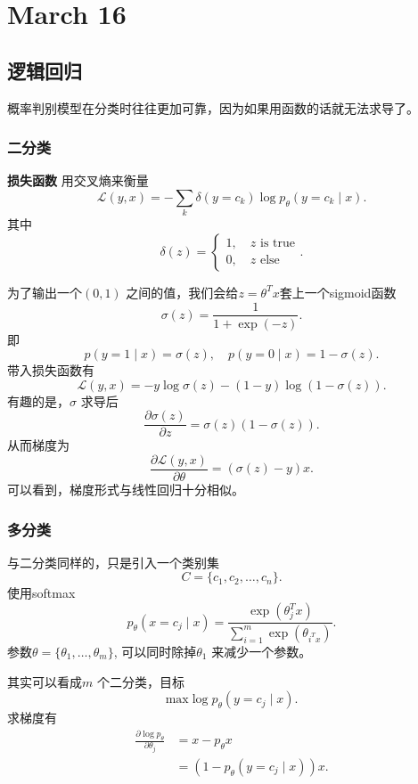 
\chapter{March 16}
\section{逻辑回归} 
概率判别模型在分类时往往更加可靠，因为如果用函数的话就无法求导了。
\subsection{二分类}
\noindent \textbf{损失函数}
用交叉熵来衡量
\[
		\mathcal{L}\left( y,x \right)  = -\sum_{k} \delta\left( y=c_{k} \right) \log p_{\theta}\left( y=c_k \mid x \right) 
.\] 
其中
\[
		\delta\left( z \right)  = \begin{cases}
				1, \quad z \text{ is true} \\
				0, \quad z \text{ else}
		\end{cases}
.\] 

为了输出一个$\left( 0,1 \right) $ 之间的值，我们会给$z=\theta^{T}x$套上一个sigmoid函数
\[
		\sigma\left( z \right)  = \frac{1}{1+\exp\left( -z \right) }
.\] 
即
\[
		p\left( y=1 \mid x \right) =\sigma\left( z \right), \quad p\left( y=0 \mid x \right) = 1-\sigma\left( z \right) 
.\] 
带入损失函数有
\[
		\mathcal{L}\left( y,x \right)  = -y\log \sigma\left( z \right)  - \left( 1-y \right) \log\left( 1-\sigma\left( z \right)  \right) 
.\] 
有趣的是，$\sigma$ 求导后
\[
		\frac{\partial \sigma\left( z \right) }{\partial z} = \sigma\left( z \right) \left( 1-\sigma\left( z \right)  \right) 
.\] 
从而梯度为
\[
		\frac{\partial \mathcal{L}\left( y,x \right) }{\partial \theta}  = \left( \sigma\left( z \right) -y \right) x
.\] 
可以看到，梯度形式与线性回归十分相似。
\subsection{多分类}
与二分类同样的，只是引入一个类别集
\[
C = \{c_1,c_2,\ldots,c_{n}\} 
.\] 
使用softmax
\[
		p_{\theta}\left( x=c_{j}  \mid  x \right)  = \frac{\exp\left( \theta_{j}^{T}x \right) }{\sum_{i=1}^{m} \exp\left( \theta_{i^{T}x} \right) }
.\] 
参数$\theta = \{\theta_{1},\ldots,\theta_{m}\} $, 可以同时除掉$\theta_{1}$ 来减少一个参数。

其实可以看成$m$ 个二分类，目标
\[
		\mathrm{max} \log p_{\theta}\left( y=c_{j} \mid x \right) 
.\] 
求梯度有
\begin{align*}
		\frac{\partial \log p_{\theta}}{\partial \theta_{j}} 
		&= x - p_{\theta}x  \\
		&= \left( 1-p_{\theta}\left( y=c_j \mid x \right)  \right) x 
.\end{align*} 
